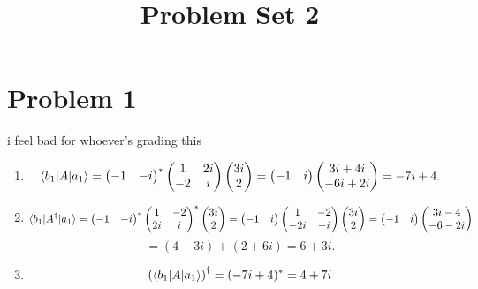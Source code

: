 \documentclass[11pt, letterpaper]{article}
\title{Problem Set 2}
\begin{document}
\makeproblem
\section*{Problem 1}
	i feel bad for whoever's grading this
\begin{enumerate}
	\item 
		\[
			\langle b_1\rvert A \lvert a_1\rangle =\begin{pmatrix}
			-1 & -i
			\end{pmatrix}^* \begin{pmatrix}
			1 & 2i \\
			-2 & i
			\end{pmatrix} \begin{pmatrix}
			3i \\
			2
			\end{pmatrix} = \begin{pmatrix}
			-1 & i
			\end{pmatrix} \begin{pmatrix}
			3i+4i \\
			-6i+2i
			\end{pmatrix} = -7i+4
		.\]
	\item 
		\[
			\langle b_1\rvert A^\dagger \lvert a_1\rangle = \begin{pmatrix}
			-1 & -i
			\end{pmatrix}^* \begin{pmatrix}
			1 & -2 \\
			2i & i
			\end{pmatrix}^* \begin{pmatrix}
			3i \\
			2
			\end{pmatrix} = \begin{pmatrix}
			-1 & i
			\end{pmatrix} \begin{pmatrix}
			1 & -2 \\
			-2i & -i
			\end{pmatrix} \begin{pmatrix}
			3i \\
			2
			\end{pmatrix}=\begin{pmatrix}
			-1 & i
			\end{pmatrix} \begin{pmatrix}
			3i-4 \\
			-6-2i
			\end{pmatrix}
		\]
		\[
			 = (4-3i)+(2+6i)=6+3i
		.\]
	\item 
		\[
			\left( \langle b_1\rvert A \lvert a_1\rangle  \right) ^{\dagger} =(-7i+4)^* = 4+7i
\]
\end{enumerate}
\end{document}
